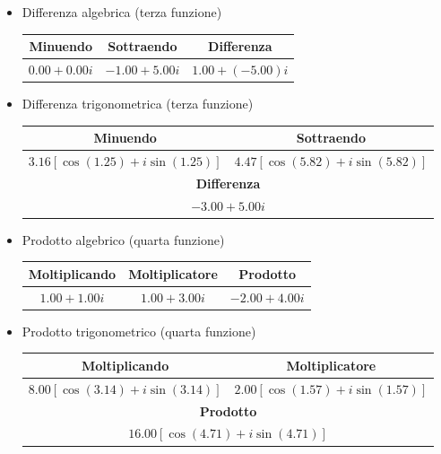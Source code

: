 \documentclass[a4paper,10pt]{article}
\begin{document}
\begin{itemize}
    \item Differenza algebrica (terza funzione)\\
    	\begin{tabular}{|*3{c|}}
	\hline
	\bfseries Minuendo		& \bfseries Sottraendo		& \bfseries Differenza\\
	\hline
	$0.00 + 0.00 i$			& $-1.00 + 5.00 i$		& $1.00 + (-5.00) i$\\
	\hline
	\end{tabular}

    \item Differenza trigonometrica (terza funzione)\\
    	\begin{tabular}{|*2{c|}}
	\hline
	\bfseries Minuendo						& \bfseries Sottraendo\\
	\hline
	$3.16[\cos{\left(1.25\right)} + i\sin{\left(1.25\right)}]$	& $4.47[\cos{\left(5.82\right)} + i\sin{\left(5.82\right)}]$\\
	\hline
	\multicolumn{2}{|c|}{\textbf{Differenza}}\\
	\hline
	\multicolumn{2}{|c|}{$-3.00 + 5.00 i$}\\
	\hline
	\end{tabular}

    \item Prodotto algebrico (quarta funzione)\\
    	\begin{tabular}{|*3{c|}}
	\hline
	\bfseries Moltiplicando		& \bfseries Moltiplicatore	& \bfseries Prodotto\\
	\hline
	$1.00 + 1.00 i$			& $1.00 + 3.00 i$		& $-2.00 + 4.00 i$\\
	\hline
	\end{tabular}

    \item Prodotto trigonometrico (quarta funzione)\\
    	\begin{tabular}{|*2{c|}}
	\hline
	\bfseries Moltiplicando						& \bfseries Moltiplicatore\\
	\hline
	$8.00[\cos{\left(3.14\right)} + i\sin{\left(3.14\right)}]$	& $2.00[\cos{\left(1.57\right)} + i\sin{\left(1.57\right)}]$\\
	\hline
	\multicolumn{2}{|c|}{\textbf{Prodotto}}\\
	\hline
	\multicolumn{2}{|c|}{$16.00[\cos{\left(4.71\right)} + i\sin{\left(4.71\right)}]$}\\
	\hline
	\end{tabular}


\end{itemize}
\end{document}
